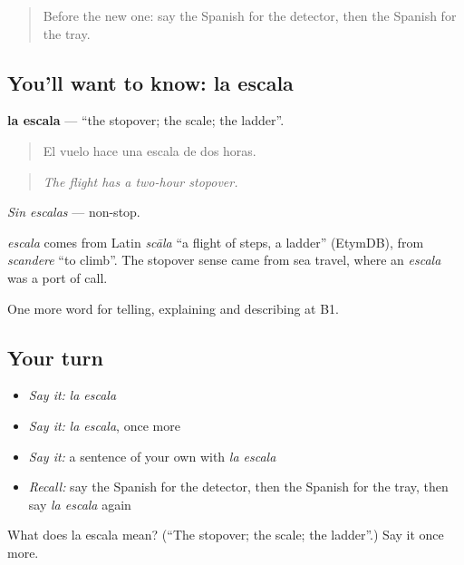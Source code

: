 \label{lesson:ES-C653-escala}



\begin{quote}
Before the new one: say the Spanish for the detector, then the Spanish for the tray.
\end{quote}

\subsection*{You'll want to know: la escala}
\textbf{la escala} — \textquotedblleft{}the stopover; the scale; the ladder\textquotedblright{}.

\begin{quote}
El vuelo hace una escala de dos horas.
\end{quote}

\begin{quote}
\emph{The flight has a two-hour stopover.}
\end{quote}

\emph{Sin escalas} — non-stop.

\begin{cousinweb}
\emph{escala} comes from Latin \emph{scāla} \textquotedblleft{}a flight of steps, a ladder\textquotedblright{} (EtymDB), from \emph{scandere} \textquotedblleft{}to climb\textquotedblright{}. The stopover sense came from sea travel, where an \emph{escala} was a port of call.
\end{cousinweb}

\begin{grammarlens}[title={What you've built}]
One more word for telling, explaining and describing at B1.
\end{grammarlens}

\subsection*{Your turn}
\begin{itemize}
\raggedright
  \item \emph{Say it:} \emph{la escala}
  \item \emph{Say it:} \emph{la escala}, once more
  \item \emph{Say it:} a sentence of your own with \emph{la escala}
  \item \emph{Recall:} say the Spanish for the detector, then the Spanish for the tray, then say \emph{la escala} again
\end{itemize}

\begin{tcolorbox}[breakable,colback=teal!4,colframe=teal!35!black,title={Before you move on}]
What does la escala mean? (\textquotedblleft{}The stopover; the scale; the ladder\textquotedblright{}.) Say it once more.
\end{tcolorbox}
